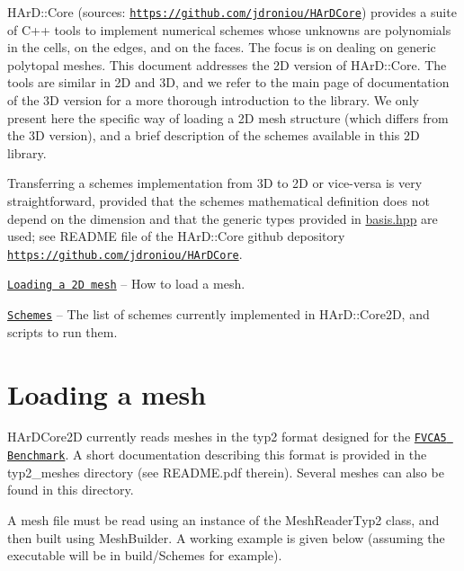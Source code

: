 H\+Ar\+D\+::\+Core (sources\+: \href{https://github.com/jdroniou/HArDCore}{\tt https\+://github.\+com/jdroniou/\+H\+Ar\+D\+Core}) provides a suite of C++ tools to implement numerical schemes whose unknowns are polynomials in the cells, on the edges, and on the faces. The focus is on dealing on generic polytopal meshes. This document addresses the 2D version of H\+Ar\+D\+::\+Core. The tools are similar in 2D and 3D, and we refer to the main page of documentation of the 3D version for a more thorough introduction to the library. We only present here the specific way of loading a 2D mesh structure (which differs from the 3D version), and a brief description of the schemes available in this 2D library.

Transferring a scheme\textquotesingle{}s implementation from 3D to 2D or vice-\/versa is very straightforward, provided that the scheme\textquotesingle{}s mathematical definition does not depend on the dimension and that the generic types provided in {\ttfamily \hyperlink{basis_8hpp_source}{basis.\+hpp}} are used; see R\+E\+A\+D\+ME file of the H\+Ar\+D\+::\+Core github depository \href{https://github.com/jdroniou/HArDCore}{\tt https\+://github.\+com/jdroniou/\+H\+Ar\+D\+Core}.


\begin{DoxyItemize}
\item \href{#mesh}{\tt Loading a 2D mesh} -- How to load a mesh.
\item \href{#schemes}{\tt Schemes} -- The list of schemes currently implemented in H\+Ar\+D\+::\+Core2D, and scripts to run them.
\end{DoxyItemize}

\label{_mesh}%
 \hypertarget{index_loading_mesh}{}\section{Loading a mesh}\label{index_loading_mesh}
H\+Ar\+D\+Core2D currently reads meshes in the {\ttfamily typ2} format designed for the \href{https://www.i2m.univ-amu.fr/fvca5/benchmark/index.html}{\tt F\+V\+C\+A5 Benchmark}. A short documentation describing this format is provided in the {\ttfamily typ2\+\_\+meshes} directory (see R\+E\+A\+D\+M\+E.\+pdf therein). Several meshes can also be found in this directory.

A mesh file must be read using an instance of the {\ttfamily Mesh\+Reader\+Typ2} class, and then built using {\ttfamily Mesh\+Builder}. A working example is given below (assuming the executable will be in {\ttfamily build/\+Schemes} for example).


